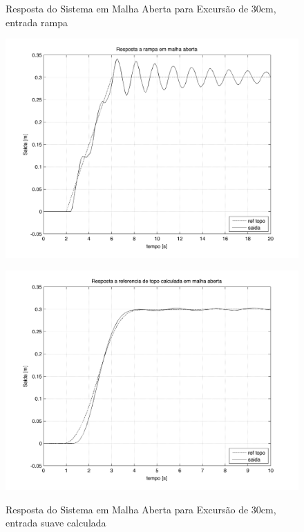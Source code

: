  \begin{figure}[!htb]
    \centering
    \begin{minipage}{.45\textwidth}
        \centering
        \caption{Resposta do Sistema em Malha Aberta para Excursão de 30cm, entrada rampa}
        \includegraphics[width=1\linewidth]{figs/resultados/simulacao/respostaMalhaAbertaRampa}
        \label{respostaMalhaAbertaRampa}
    \end{minipage}%
    \hspace{0.1cm}
    \begin{minipage}{0.45\textwidth}
        \centering
        \caption{Resposta do Sistema em Malha Aberta para Excursão de 30cm, entrada suave calculada}
        \includegraphics[width=1\linewidth]{figs/resultados/simulacao/respostaMalhaAbertaRefTopo}
        \label{respostaMalhaAbertaEntradaSuave}
    \end{minipage}
\end{figure}

